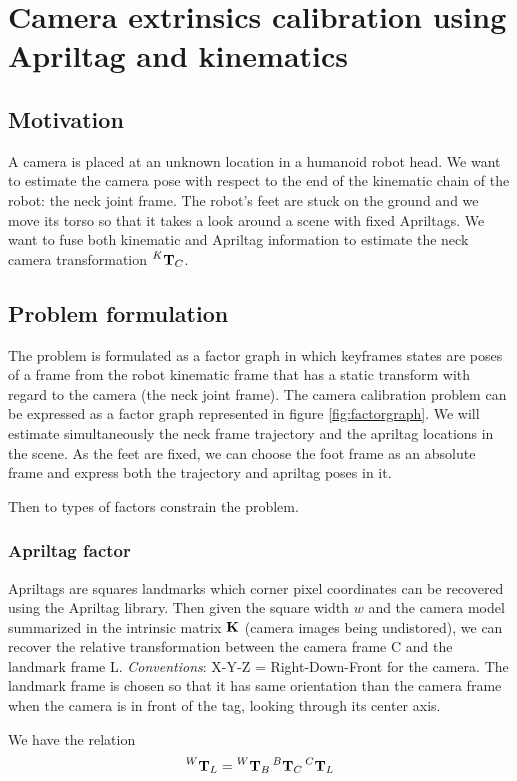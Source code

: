 \documentclass[11pt]{article}
\newcommand{\T}[2]{\prescript{#1}{}{\bfT}_{#2}}
\begin{document}
\section{Camera extrinsics calibration using Apriltag and kinematics}
\subsection{Motivation}
A camera is placed at an unknown location in a humanoid robot head. We want to estimate the camera pose with respect to the end of the kinematic chain of the robot: the neck joint frame.
The robot's feet are stuck on the ground and we move its torso so that it takes a look around a scene with fixed Apriltags. We want to fuse both kinematic and Apriltag information to estimate the neck camera transformation $\T{K}{C}$.

\subsection{Problem formulation}
The problem is formulated as a factor graph in which keyframes states are poses of a frame from the robot kinematic frame that has a static transform with regard to the camera (the neck joint frame). The camera calibration problem can be expressed as a factor graph represented in figure \ref{fig:factorgraph}. We will estimate simultaneously the neck frame trajectory and the apriltag locations in the scene. As the feet are fixed, we can choose the foot frame as an absolute frame and express both the trajectory and apriltag poses in it.

Then to types of factors constrain the problem.

\subsubsection*{Apriltag factor}
Apriltags are squares landmarks which corner pixel coordinates can be recovered using the Apriltag library. Then given the square width $w$ and the camera model summarized in the intrinsic matrix ${\bf K}$ (camera images being undistored), we can recover the relative transformation between the camera frame C and the landmark frame L.
\textit{Conventions}: X-Y-Z = Right-Down-Front for the camera. The landmark frame is chosen so that it has same orientation than the camera frame when the camera is in front of the tag, looking through its center axis.

We have the relation 
\begin{equation}
    \T{W}{L} = \T{W}{B}\T{B}{C}\T{C}{L}
\end{equation}
\end{document}
